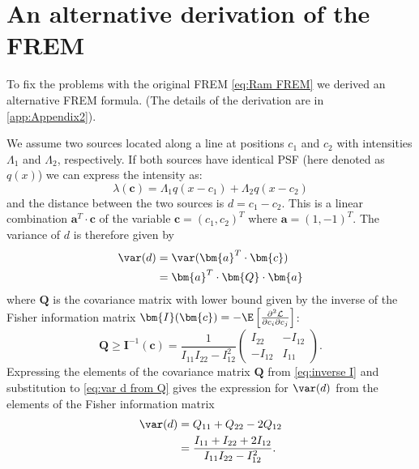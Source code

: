 
\section{An alternative derivation of the FREM\label{sub:An-alternative-derivation-FREM}} 

To fix the problems with the original FREM \autoref{eq:Ram FREM} we derived an alternative FREM formula. (The details of the derivation are in \autoref{app:Appendix2}). 

We assume two sources located along a line at positions $c_1$ and $c_2$ with intensities $\Lambda_1$ and $\Lambda_2$, respectively. If both sources have identical PSF (here denoted as $q(x)$) we can express the intensity as:
%
\begin{equation}
	\lambda(\bm{c})=\Lambda_1q(x-c_1)+\Lambda_2q(x-c_2)
	\label{eq:lambda}
\end{equation}
%
and the distance between the two sources is $d=c_1-c_2$. This is a linear combination $\bm{a}^{T}\cdot\bm{c}$ of the variable $\bm{c}=(c_1,c_2)^{T}$ where $\bm{a}=(1,-1)^{T}$. The variance of $d$ is therefore given by 
%
\begin{alignat}{2}
	\var(d)
	&=\var(\bm{a}^{T}\cdot\bm{c})\nonumber\\
	&=\bm{a}^{T}\cdot\bm{Q}\cdot\bm{a}
	\label{eq:var d from Q}
\end{alignat}
%
where $\bm{Q}$ is the covariance matrix with lower bound given by the inverse of the Fisher information matrix $\bm{I}(\bm{c})=-\E\left[\frac{\partial^2\mathcal{L}}{\partial c_i\partial c_j}\right]$: 
%
\begin{equation}
	\bm{Q}\geq\bm{I}^{-1}(\bm{c})=\frac{1}{I_{11}I_{22}-I_{12}^2}\left(
	\begin{array}{cc}
		I_{22} & -I_{12}\\
		-I_{12} & I_{11}
	\end{array}\right).
	\label{eq:inverse I}
\end{equation}
%
Expressing the elements of the covariance matrix $\bm{Q}$ from \autoref{eq:inverse I} and substitution to \autoref{eq:var d from Q} gives the expression for $\var(d)$ from the elements of the Fisher information matrix
%
\begin{alignat}{2}
	\var(d)
	&=Q_{11}+Q_{22}-2Q_{12}\nonumber\\
	&=\frac{I_{11}+I_{22}+2I_{12}}{I_{11}I_{22}-I_{12}^2}.
	\label{eq:variance d alternative}
\end{alignat}

